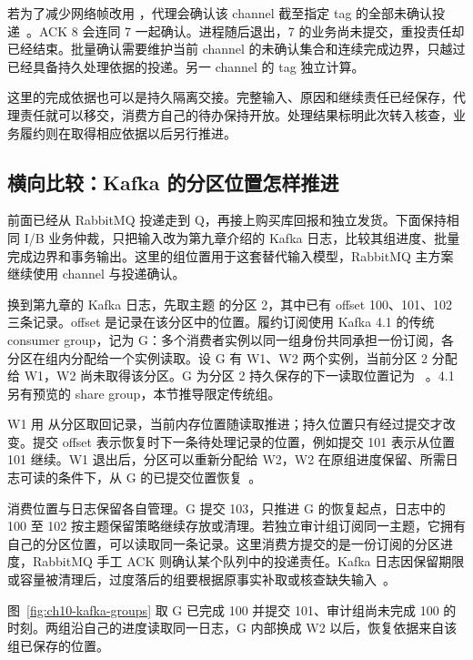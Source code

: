 若为了减少网络帧改用 ，代理会确认该 channel 截至指定 tag 的全部未确认投递~\cite{rabbitmq-confirms}。ACK 8 会连同 7 一起确认。进程随后退出，7 的业务尚未提交，重投责任却已经结束。批量确认需要维护当前 channel 的未确认集合和连续完成边界，只越过已经具备持久处理依据的投递。另一 channel 的 tag 独立计算。

这里的完成依据也可以是持久隔离交接。完整输入、原因和继续责任已经保存，代理责任就可以移交，消费方自己的待办保持开放。处理结果标明此次转入核查，业务履约则在取得相应依据以后另行推进。



\subsection*{横向比较：Kafka 的分区位置怎样推进}

前面已经从 RabbitMQ 投递走到 Q，再接上购买库回报和独立发货。下面保持相同 I/B 业务仲裁，只把输入改为第九章介绍的 Kafka 日志，比较其组进度、批量完成边界和事务输出。这里的组位置用于这套替代输入模型，RabbitMQ 主方案继续使用 channel 与投递确认。

换到第九章的 Kafka 日志，先取主题  的分区 2，其中已有 offset 100、101、102 三条记录。offset 是记录在该分区中的位置。履约订阅使用 Kafka 4.1 的传统 consumer group，记为 G：多个消费者实例以同一组身份共同承担一份订阅，各分区在组内分配给一个实例读取。设 G 有 W1、W2 两个实例，当前分区 2 分配给 W1，W2 尚未取得该分区。G 为分区 2 持久保存的下一读取位置记为 ~\cite{kafka-design,kafka-consumer-api}。4.1 另有预览的 share group，本节推导限定传统组。

W1 用  从分区取回记录，当前内存位置随读取推进；持久位置只有经过提交才改变。提交 offset 表示恢复时下一条待处理记录的位置，例如提交 101 表示从位置 101 继续。W1 退出后，分区可以重新分配给 W2，W2 在原组进度保留、所需日志可读的条件下，从 G 的已提交位置恢复~\cite{kafka-consumer-api}。

消费位置与日志保留各自管理。G 提交 103，只推进 G 的恢复起点，日志中的 100 至 102 按主题保留策略继续存放或清理。若独立审计组订阅同一主题，它拥有自己的分区位置，可以读取同一条记录。这里消费方提交的是一份订阅的分区进度，RabbitMQ 手工 ACK 则确认某个队列中的投递责任。Kafka 日志因保留期限或容量被清理后，过度落后的组要根据原事实补取或核查缺失输入~\cite{kafka-design,kafka-consumer-api}。

图~\ref{fig:ch10-kafka-groups} 取 G 已完成 100 并提交 101、审计组尚未完成 100 的时刻。两组沿自己的进度读取同一日志，G 内部换成 W2 以后，恢复依据来自该组已保存的位置。

